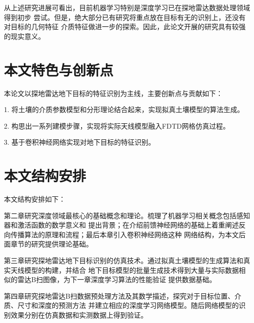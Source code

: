 从上述研究进展可看出，目前机器学习特别是深度学习已在探地雷达数据处理领域得到初步
尝试。但是，绝大部分已有研究将重点放在目标有无的识别上，还没有对目标的几何特征
介质特征做进一步的探索。因此，此论文开展的研究具有较强的现实意义。
\section{本文特色与创新点}
本论文以探地雷达地下目标的特征识别为主线，主要创新点与贡献如下：

1. 将土壤的介质参数模型和分形理论结合起来，实现拟真土壤模型的算法生成。

2. 构思出一系列建模步骤，实现将实际天线模型融入FDTD网格仿真过程。

3. 基于卷积神经网络实现对地下目标的特征识别。
\section{本文结构安排}
本文结构安排如下：

第二章研究深度领域最核心的基础概念和理论。梳理了机器学习相关概念包括感知器和激活函数的数学意义和
提出背景；在介绍前馈神经网络的基础上着重阐述反向传播算法的原理和流程；最后本章引入卷积神经网络这种
网络结构，为本文后面章节的研究提供理论基础。

第三章研究探地雷达地下目标识别的仿真技术。通过拟真土壤模型的生成算法和真实天线模型的构建，并结合
地下目标模型的批量生成技术得到大量与实际数据相似的雷达B扫图像，为下一章深度学习算法的性能验证
提供数据基础。

第四章研究探地雷达B扫数据预处理方法及其数学描述，探究对于目标位置、介质、尺寸和深度的预测方法
并建立相应的深度学习网络模型。随后网络模型的识别效果分别在仿真数据和实测数据上得到验证。

